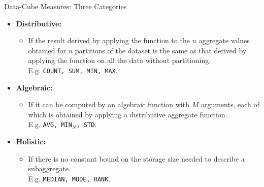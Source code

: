 \begin{frame}{Data-Cube Measures: Three Categories}
	\begin{itemize}
		\item \textbf{Distributive:}
		      \begin{itemize}
			      \item If the result derived by applying the function to the $n$ aggregate values obtained for $n$ partitions of the dataset is the same as that derived by applying the function on all the data without partitioning.\\
			            E.g. \texttt{COUNT, SUM, MIN, MAX}.
		      \end{itemize}
		\item \textbf{Algebraic:}
		      \begin{itemize}
			      \item If it can be computed by an algebraic function with $M$ arguments, each of which is obtained by applying a distributive aggregate function.\\
			            E.g. \texttt{AVG, MIN$_N$, STD}.
		      \end{itemize}
		\item \textbf{Holistic:}
		      \begin{itemize}
			      \item If there is no constant bound on the storage size needed to describe a subaggregate.\\
			            E.g. \texttt{MEDIAN, MODE, RANK}.
		      \end{itemize}
	\end{itemize}
\end{frame}


